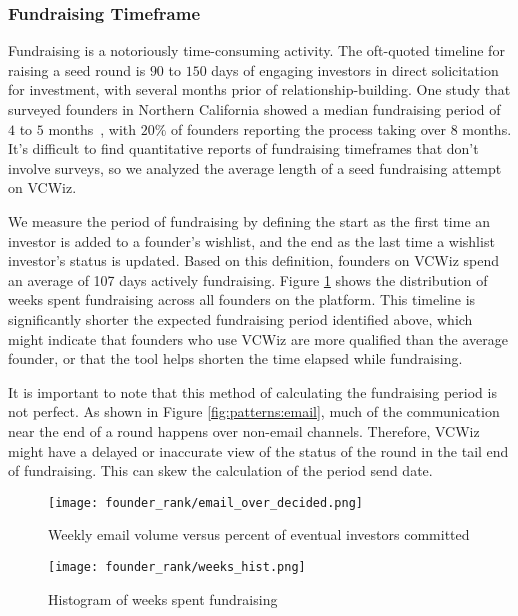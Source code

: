 \subsubsection{Fundraising Timeframe}
\label{ch5:timeline}

Fundraising is a notoriously time-consuming activity. The oft-quoted timeline for raising a seed round is $90$ to $150$ days of engaging investors in direct solicitation for investment, with several months prior of relationship-building. One study that surveyed founders in Northern California showed a median fundraising period of $4$ to $5$ months~\cite{BRUNO198561}, with $20\%$ of founders reporting the process taking over $8$ months. It's difficult to find quantitative reports of fundraising timeframes that don't involve surveys, so we analyzed the average length of a seed fundraising attempt on VCWiz.

We measure the period of fundraising by defining the start as the first time an investor is added to a founder's wishlist, and the end as the last time a wishlist investor's status is updated. Based on this definition, founders on VCWiz spend an average of 107 days actively fundraising. Figure \ref{fig:patterns:fundraising} shows the distribution of weeks spent fundraising across all founders on the platform. This timeline is significantly shorter the expected fundraising period identified above, which might indicate that founders who use VCWiz are more qualified than the average founder, or that the tool helps shorten the time elapsed while fundraising.

It is important to note that this method of calculating the fundraising period is not perfect. As shown in Figure \ref{fig:patterns:email}, much of the communication near the end of a round happens over non-email channels. Therefore, VCWiz might have a delayed or inaccurate view of the status of the round in the tail end of fundraising. This can skew the calculation of the period send date.

\begin{figure}[H]
  \centering
  \begin{minipage}[t]{0.45\textwidth}
    \centering
    \texttt{[image: founder\_rank/email\_over\_decided.png]}
    \caption{Weekly email volume versus percent of eventual investors committed}
    \label{fig:patterns:email}
  \end{minipage}\hfill
  \begin{minipage}[t]{0.45\textwidth}
    \centering
    \texttt{[image: founder\_rank/weeks\_hist.png]}
    \caption{Histogram of weeks spent fundraising}
    \label{fig:patterns:fundraising}
  \end{minipage}
\end{figure}

